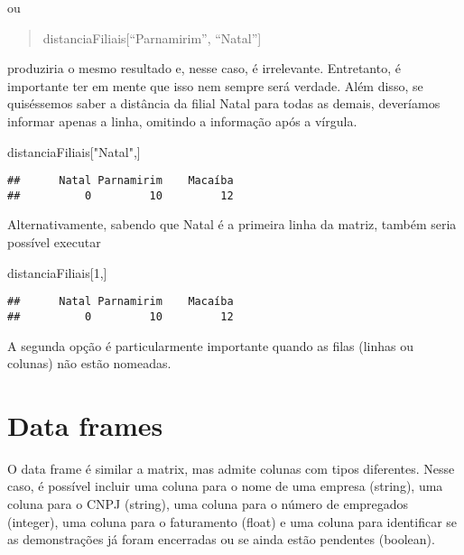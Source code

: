 \documentclass[
]{book}
\newenvironment{Shaded}{\begin{snugshade}}{\end{snugshade}}
\newcommand{\DecValTok}[1]{\textcolor[rgb]{0.00,0.00,0.81}{#1}}
\newcommand{\NormalTok}[1]{#1}
\newcommand{\StringTok}[1]{\textcolor[rgb]{0.31,0.60,0.02}{#1}}
\begin{document}
ou

\begin{quote}
distanciaFiliais{[}``Parnamirim'', ``Natal''{]}
\end{quote}

produziria o mesmo resultado e, nesse caso, é irrelevante. Entretanto, é importante ter em mente que isso nem sempre será verdade. Além disso, se quiséssemos saber a distância da filial Natal para todas as demais, deveríamos informar apenas a linha, omitindo a informação após a vírgula.

\begin{Shaded}
\begin{Highlighting}[]
\NormalTok{distanciaFiliais[}\StringTok{"Natal"}\NormalTok{,]}
\end{Highlighting}
\end{Shaded}

\begin{verbatim}
##      Natal Parnamirim    Macaíba 
##          0         10         12
\end{verbatim}

Alternativamente, sabendo que Natal é a primeira linha da matriz, também seria possível executar

\begin{Shaded}
\begin{Highlighting}[]
\NormalTok{distanciaFiliais[}\DecValTok{1}\NormalTok{,]}
\end{Highlighting}
\end{Shaded}

\begin{verbatim}
##      Natal Parnamirim    Macaíba 
##          0         10         12
\end{verbatim}

A segunda opção é particularmente importante quando as filas (linhas ou colunas) não estão nomeadas.

\hypertarget{data-frames}{%
\section{Data frames}\label{data-frames}}

O data frame é similar a matrix, mas admite colunas com tipos diferentes. Nesse caso, é possível incluir uma coluna para o nome de uma empresa (string), uma coluna para o CNPJ (string), uma coluna para o número de empregados (integer), uma coluna para o faturamento (float) e uma coluna para identificar se as demonstrações já foram encerradas ou se ainda estão pendentes (boolean).
\end{document}

